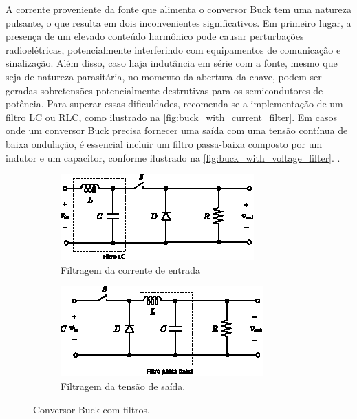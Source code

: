 A corrente proveniente da fonte que alimenta o conversor Buck tem uma natureza pulsante, o que resulta em dois inconvenientes significativos. Em primeiro lugar, a presença de um elevado conteúdo harmônico pode causar perturbações radioelétricas, potencialmente interferindo com equipamentos de comunicação e sinalização. Além disso, caso haja indutância em série com a fonte, mesmo que seja de natureza parasitária, no momento da abertura da chave, podem ser geradas sobretensões potencialmente destrutivas para os semicondutores de potência. Para superar essas dificuldades, recomenda-se a implementação de um filtro LC ou RLC, como ilustrado na \autoref{fig:buck_with_current_filter}. Em casos onde um conversor Buck precisa fornecer uma saída com uma tensão contínua de baixa ondulação, é essencial incluir um filtro passa-baixa composto por um indutor e um capacitor, conforme ilustrado na \autoref{fig:buck_with_voltage_filter}. \cite{martins2008}.

\begin{figure}[H]
  \captionsetup{justification=centering}
  \centering
  \begin{subfigure}[t]{0.45\textwidth}
    \centering
    \includegraphics[width=\textwidth]{figuras/buck_with_current_filter.eps}
    \caption{Filtragem da corrente de entrada}
    \label{fig:buck_with_current_filter}
  \end{subfigure}
  \hfill
  \begin{subfigure}[t]{0.45\textwidth}
    \centering
    \includegraphics[width=\textwidth]{figuras/buck_with_voltage_filter.eps}
    \caption{Filtragem da tensão de saída.}
    \label{fig:buck_with_voltage_filter}
  \end{subfigure}
  \caption{Conversor Buck com filtros.}
\end{figure}

